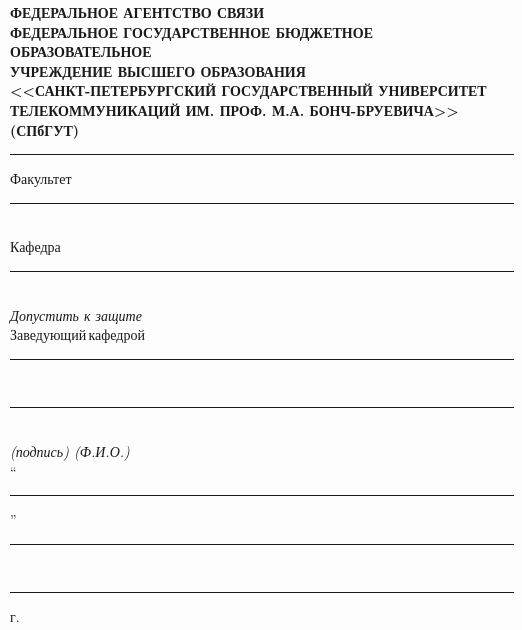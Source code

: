 \thispagestyle{empty}
\singlespacing{}
\setlength{\parindent}{0pt}

\begin{center}
{\fontsize{10.7pt}{13pt}\selectfont
    \textbf{ФЕДЕРАЛЬНОЕ АГЕНТСТВО СВЯЗИ\\
    \vspace{0.5em}
    ФЕДЕРАЛЬНОЕ ГОСУДАРСТВЕННОЕ БЮДЖЕТНОЕ ОБРАЗОВАТЕЛЬНОЕ\\
    УЧРЕЖДЕНИЕ ВЫСШЕГО ОБРАЗОВАНИЯ\\
    <<САНКТ-ПЕТЕРБУРГСКИЙ ГОСУДАРСТВЕННЫЙ УНИВЕРСИТЕТ ТЕЛЕКОММУНИКАЦИЙ
    ИМ. ПРОФ. М.А. БОНЧ-БРУЕВИЧА>>\\
    (СПбГУТ)}\\}
\textcolor{gray}{\rule{\textwidth}{0.8pt}}
\end{center}
\vspace{-6mm}
\hspace*{3.1cm}Факультет \rule[-1mm]{8cm}{0.6pt}\\[1mm]
\hspace*{3.18cm}Кафедра \rule[-1mm]{8.3cm}{0.6pt}\\
\hspace*{9.95cm}\textit{\small{}Допустить к защите}\\[2mm]
\hspace*{7.3cm}Заведующий\,кафедрой\\[0.5mm]
\hspace*{7.3cm}\rule{2cm}{0.6pt}~\rule{5cm}{0.6pt}\\[-2.3mm]
\hspace*{6.66cm}\textit{\small{(подпись)\hspace{2.4cm}
    {\fontsize{8.5pt}{0pt}\selectfont(Ф.И.О.)}}}\\[1mm]
\hspace*{7.3cm}``\rule[-1mm]{1cm}{0.6pt}''%
    \rule[-1mm]{2.72cm}{0.6pt}\,\rule[-1mm]{1.5cm}{0.6pt}\:г\hspace{0.01mm}.\\
